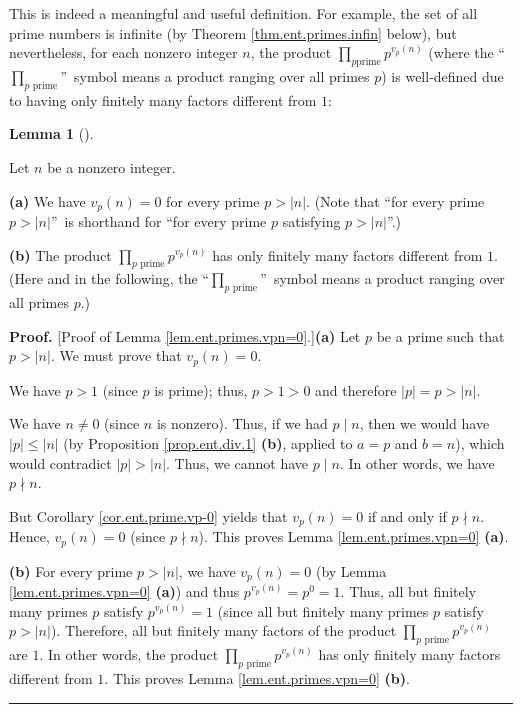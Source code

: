 \documentclass[numbers=enddot,12pt,final,onecolumn,notitlepage]{scrartcl}%
\numberwithin{exer}{subsection}
\theoremstyle{definition}
\newtheorem{lem}[theo]{Lemma}
\newenvironment{lemma}[1][]
{\begin{lem}[#1]\begin{leftbar}}
{\end{leftbar}\end{lem}}
\newenvironment{proof}[1][Proof]{\noindent\textbf{#1.} }{\ \rule{0.5em}{0.5em}}
\let\prodnonlimits\prod
\renewcommand{\prod}{\prodnonlimits\limits}
\begin{document}
This is indeed a meaningful and useful definition. For example, the set of all
prime numbers is infinite (by Theorem \ref{thm.ent.primes.infin} below), but
nevertheless, for each nonzero integer $n$, the product $\prod_{p\text{
prime}}p^{v_{p}\left(  n\right)  }$ (where the \textquotedblleft%
$\prod_{p\text{ prime}}$\textquotedblright\ symbol means a product ranging
over all primes $p$) is well-defined due to having only finitely many factors
different from $1$:

\begin{lemma}
\label{lem.ent.primes.vpn=0}Let $n$ be a nonzero integer.

\textbf{(a)} We have $v_{p}\left(  n\right)  =0$ for every prime $p>\left\vert
n\right\vert $. (Note that \textquotedblleft for every prime $p>\left\vert
n\right\vert $\textquotedblright\ is shorthand for \textquotedblleft for every
prime $p$ satisfying $p>\left\vert n\right\vert $\textquotedblright.)

\textbf{(b)} The product $\prod_{p\text{ prime}}p^{v_{p}\left(  n\right)  }$
has only finitely many factors different from $1$. (Here and in the following,
the \textquotedblleft$\prod_{p\text{ prime}}$\textquotedblright\ symbol means
a product ranging over all primes $p$.)
\end{lemma}

\begin{proof}
[Proof of Lemma \ref{lem.ent.primes.vpn=0}.]\textbf{(a)} Let $p$ be a prime
such that $p>\left\vert n\right\vert $. We must prove that $v_{p}\left(
n\right)  =0$.

We have $p>1$ (since $p$ is prime); thus, $p>1>0$ and therefore $\left\vert
p\right\vert =p>\left\vert n\right\vert $.

We have $n\neq0$ (since $n$ is nonzero). Thus, if we had $p\mid n$, then we
would have $\left\vert p\right\vert \leq\left\vert n\right\vert $ (by
Proposition \ref{prop.ent.div.1} \textbf{(b)}, applied to $a=p$ and $b=n$),
which would contradict $\left\vert p\right\vert >\left\vert n\right\vert $.
Thus, we cannot have $p\mid n$. In other words, we have $p\nmid n$.

But Corollary \ref{cor.ent.prime.vp-0} yields that $v_{p}\left(  n\right)  =0$
if and only if $p\nmid n$. Hence, $v_{p}\left(  n\right)  =0$ (since $p\nmid
n$). This proves Lemma \ref{lem.ent.primes.vpn=0} \textbf{(a)}.

\textbf{(b)} For every prime $p>\left\vert n\right\vert $, we have
$v_{p}\left(  n\right)  =0$ (by Lemma \ref{lem.ent.primes.vpn=0} \textbf{(a)})
and thus $p^{v_{p}\left(  n\right)  }=p^{0}=1$. Thus, all but finitely many
primes $p$ satisfy $p^{v_{p}\left(  n\right)  }=1$ (since all but finitely
many primes $p$ satisfy $p>\left\vert n\right\vert $). Therefore, all but
finitely many factors of the product $\prod_{p\text{ prime}}p^{v_{p}\left(
n\right)  }$ are $1$. In other words, the product $\prod_{p\text{ prime}%
}p^{v_{p}\left(  n\right)  }$ has only finitely many factors different from
$1$. This proves Lemma \ref{lem.ent.primes.vpn=0} \textbf{(b)}.
\end{proof}
\end{document}
